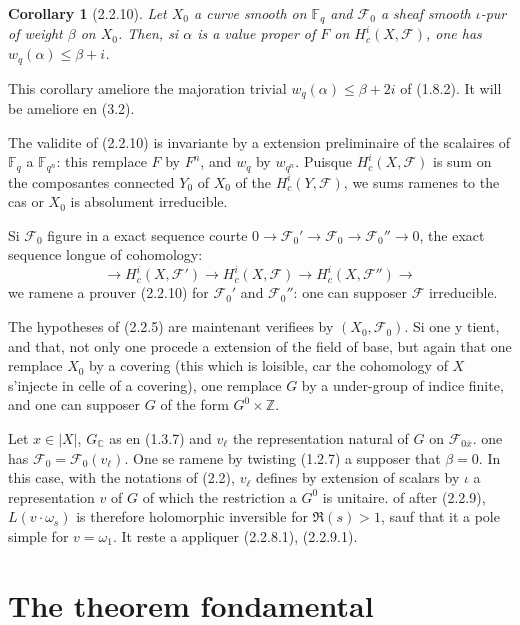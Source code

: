 \documentclass[12pt,a4paper]{article}
\theoremstyle{plain}
\newtheorem{corollary}[theorem]{Corollary}
\theoremstyle{definition}
\theoremstyle{remark}
\newcommand{\CC}{{\mathbb{C}}}
\newcommand{\FF}{{\mathbb{F}}}
\newcommand{\ZZ}{{\mathbb{Z}}}
\begin{document}
\begin{corollary}[2.2.10]
Let $X_0$ a curve smooth on $\FF_q$ and $\mathscr{F}_0$ a sheaf smooth $\iota$-pur of weight $\beta$ on $X_0$. Then, si $\alpha$ is a value proper of $F$ on $H_c^i(X, \mathscr{F})$, one has $w_q(\alpha) \leq \beta + i$.
\end{corollary}

This corollary ameliore the majoration trivial $w_q(\alpha) \leq \beta + 2i$ of (1.8.2). It will be ameliore en (3.2).

The validite of (2.2.10) is invariante by a extension preliminaire of the scalaires of $\FF_q$ a $\FF_{q^n}$: this remplace $F$ by $F^n$, and $w_q$ by $w_{q^n}$. Puisque $H_c^i(X, \mathscr{F})$ is sum on the composantes connected $Y_0$ of $X_0$ of the $H_c^i(Y, \mathscr{F})$, we sums ramenes to the cas or $X_0$ is absolument irreducible.

Si $\mathscr{F}_0$ figure in a exact sequence courte $0 \to \mathscr{F}_0' \to \mathscr{F}_0 \to \mathscr{F}_0'' \to 0$, the exact sequence longue of cohomology:
\[ \to H_c^i(X, \mathscr{F}') \to H_c^i(X, \mathscr{F}) \to H_c^i(X, \mathscr{F}'') \to \]
we ramene a prouver (2.2.10) for $\mathscr{F}_0'$ and $\mathscr{F}_0''$: one can supposer $\mathscr{F}$ irreducible.

The hypotheses of (2.2.5) are maintenant verifiees by $(X_0, \mathscr{F}_0)$. Si one y tient, and that, not only one procede a extension of the field of base, but again that one remplace $X_0$ by a covering (this which is loisible, car the cohomology of $X$ s'injecte in celle of a covering), one remplace $G$ by a under-group of indice finite, and one can supposer $G$ of the form $G^0 \times \ZZ$.

Let $x \in |X|$, $G_\CC$ as en (1.3.7) and $v_\ell$ the representation natural of $G$ on $\mathscr{F}_{0\overline{x}}$. one has $\mathscr{F}_0 = \mathscr{F}_0(v_\ell)$. One se ramene by twisting (1.2.7) a supposer that $\beta = 0$. In this case, with the notations of (2.2), $v_\ell$ defines by extension of scalars by $\iota$ a representation $v$ of $G$ of which the restriction a $G^0$ is unitaire. of after (2.2.9), $L(v \cdot \omega_s)$ is therefore holomorphic inversible for $\Re(s) > 1$, sauf that it a pole simple for $v = \omega_1$. It reste a appliquer (2.2.8.1), (2.2.9.1).


\newpage
\section{The theorem fondamental}
\end{document}
